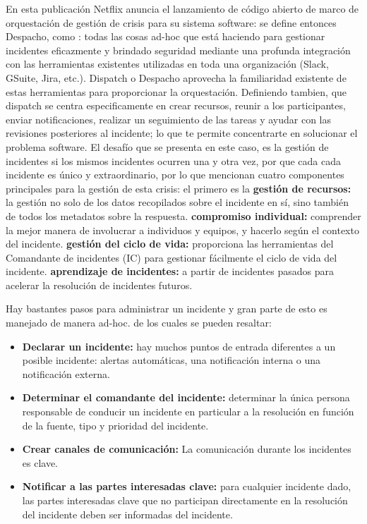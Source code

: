 \documentclass{article}
\begin{document}
En esta publicación Netflix anuncia el lanzamiento de código abierto de marco de orquestación de gestión de crisis para su sistema software: se define entonces Despacho, como : todas las cosas ad-hoc que está haciendo para gestionar incidentes eficazmente  y brindado seguridad mediante una profunda integración con las herramientas existentes utilizadas en toda una organización (Slack, GSuite, Jira, etc.). Dispatch o Despacho  aprovecha la familiaridad existente de estas herramientas para proporcionar la orquestación.
Definiendo tambien, que dispatch se centra especificamente en crear recursos, reunir a los participantes, enviar notificaciones, realizar un seguimiento de las tareas y ayudar con las revisiones posteriores al incidente; lo que te permite concentrarte en solucionar el problema software.  El desafío que se presenta en este caso, es la gestión de incidentes si los mismos incidentes ocurren una y otra vez, por que cada cada incidente es único y extraordinario, por lo que mencionan cuatro componentes principales para la gestión de esta crisis: el primero es la \textbf{gestión de recursos:} la gestión no solo de los datos recopilados sobre el incidente en sí, sino también de todos los metadatos sobre la respuesta.
\textbf{compromiso individual:} comprender la mejor manera de involucrar a individuos y equipos, y hacerlo según el contexto del incidente.
\textbf{gestión del ciclo de vida:} proporciona las herramientas del Comandante de incidentes (IC) para gestionar fácilmente el ciclo de vida del incidente.
\textbf{aprendizaje de incidentes:} a partir de incidentes pasados para acelerar la resolución de incidentes futuros.

Hay bastantes pasos para administrar un incidente y gran parte de esto es manejado de manera ad-hoc. de los cuales se pueden resaltar:

\begin{itemize}
    \item \textbf{Declarar un incidente:} hay muchos puntos de entrada diferentes a un posible incidente: alertas automáticas, una notificación interna o una notificación externa.
    \item \textbf{Determinar el comandante del incidente:} determinar la única persona responsable de conducir un incidente en particular a la resolución en función de la fuente, tipo y prioridad del incidente.
    \item \textbf{Crear canales de comunicación:} La comunicación durante los incidentes es clave.
    \item \textbf{Notificar a las partes interesadas clave:} para cualquier incidente dado, las partes interesadas clave que no participan directamente en la resolución del incidente deben ser informadas del incidente.
\end{itemize}
\end{document}
